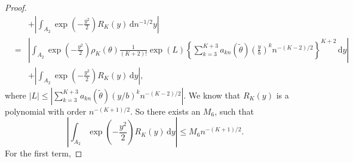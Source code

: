 \documentclass[oneside,english]{amsbook}
\numberwithin{section}{chapter}
\numberwithin{equation}{section}
\numberwithin{figure}{section}
\theoremstyle{plain}
\theoremstyle{plain}
\theoremstyle{definition}
\theoremstyle{plain}
\theoremstyle{plain}
\theoremstyle{remark}
\theoremstyle{definition}
\theoremstyle{definition}
\newcommand{\diff}{\,\mathrm{d}}
\begin{document}
\begin{proof}
\begin{eqnarray*}
 &  & +\left|\int_{A_{2}}\exp\left(-\frac{y^{2}}{2}\right)R_{K}\left(y\right)\diff n^{-1/2}y\right|\\
 & = & \left|\int_{A_{2}}\exp\left(-\frac{y^{2}}{2}\right)\rho_{K}\left(\theta\right)\frac{1}{\left(K+2\right)!}\exp\left(L\right)\left\{ \sum_{k=3}^{K+3}a_{kn}\left(\tilde{\theta}\right)\left(\frac{y}{b}\right)^{k}n^{-\left(K-2\right)/2}\right\} ^{K+2}\diff y\right|\\
 &  & +\left|\int_{A_{2}}\exp\left(-\frac{y^{2}}{2}\right)R_{K}\left(y\right)\diff y\right|,
\end{eqnarray*}
where $\left|L\right|\le\left|\sum_{k=3}^{K+3}a_{kn}\left(\tilde{\theta}\right)\left(y/b\right)^{k}n^{-\left(K-2\right)/2}\right|$.
We know that $R_{K}\left(y\right)$ is a polynomial with order $n^{-\left(K+1\right)/2}$.
So there exists an $M_{6}$, such that 
\[
\left|\int_{A_{2}}\exp\left(-\frac{y^{2}}{2}\right)R_{K}\left(y\right)\diff y\right|\le M_{6}n^{-\left(K+1\right)/2}.
\]
For the first term, 


\end{proof}
\end{document}
